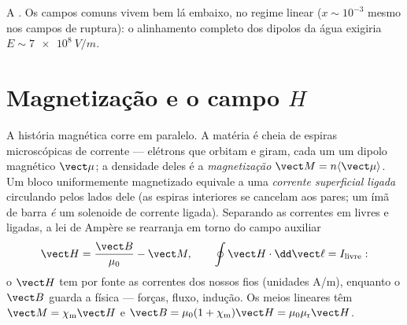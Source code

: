 \begin{omfigure}

{\small A . Os campos comuns vivem bem lá embaixo, no
regime linear ($x \sim 10^{-3}$ mesmo nos campos de ruptura): o
alinhamento completo dos dipolos da água exigiria
$E \sim \qty{7e8}{V/m}$.}
\end{omfigure}

\section{Magnetização e o campo \texorpdfstring{$H$}{H}}

\begin{definition}\label{def:b3:electromagnetism-in-matter:magnetisation}
A história magnética corre em paralelo. A matéria é cheia de espiras
microscópicas de corrente --- elétrons que orbitam e giram, cada um um
dipolo magnético $\vect\mu$; a densidade deles é a \emph{magnetização}
$\vect M = n\langle\vect\mu\rangle$. Um bloco uniformemente magnetizado
equivale a uma \emph{corrente superficial ligada} circulando pelos
lados dele (as espiras interiores se cancelam aos pares; um ímã de barra
\emph{é} um solenoide de corrente ligada). Separando as correntes em
livres e ligadas, a lei de Ampère se rearranja em torno do campo auxiliar
\[
\vect H = \frac{\vect B}{\mu_0} - \vect M , \qquad
\oint \vect H\cdot\dd\vect\ell = I_{\text{livre}} :
\]
o $\vect H$ tem por fonte as correntes dos nossos fios (unidades
\unit{A/m}), enquanto o $\vect B$ guarda a física --- forças, fluxo,
indução. Os meios lineares têm $\vect M = \chi_{\text{m}}\vect H$ e
$\vect B = \mu_0(1 + \chi_{\text{m}})\vect H =
\mu_0\mu_{\text{r}}\vect H$.
\end{definition}

